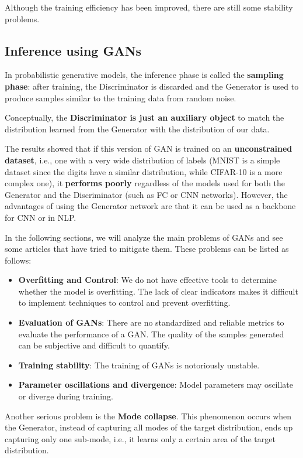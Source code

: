 Although the training efficiency has been improved, there are still some stability problems.

\subsection{Inference using GANs}
In probabilistic generative models, the inference phase is called the \textbf{sampling phase}: after training, the Discriminator is discarded and the Generator is used to produce samples similar to the training data from random noise.

Conceptually, the \textbf{Discriminator is just an auxiliary object} to match the distribution learned from the Generator with the distribution of our data.

The results showed that if this version of GAN is trained on an \textbf{unconstrained dataset}, i.e., one with a very wide distribution of labels (MNIST is a simple dataset since the digits have a similar distribution, while CIFAR-10 is a more complex one), it \textbf{performs poorly} regardless of the models used for both the Generator and the Discriminator (such as FC or CNN networks). However, the advantages of using the Generator network are that it can be used as a backbone for CNN or in NLP.

In the following sections, we will analyze the main problems of GANs and see some articles that have tried to mitigate them. These problems can be listed as follows:
\begin{itemize}
    \item \textbf{Overfitting and Control}: We do not have effective tools to determine whether the model is overfitting. The lack of clear indicators makes it difficult to implement techniques to control and prevent overfitting.
    \item \textbf{Evaluation of GANs}: There are no standardized and reliable metrics to evaluate the performance of a GAN. The quality of the samples generated can be subjective and difficult to quantify.
    \item \textbf{Training stability}: The training of GANs is notoriously unstable. 
    \item \textbf{Parameter oscillations and divergence}: Model parameters may oscillate or diverge during training. 
\end{itemize}

Another serious problem is the \textbf{Mode collapse}. This phenomenon occurs when the Generator, instead of capturing all modes of the target distribution, ends up capturing only one sub-mode, i.e., it learns only a certain area of the target distribution.

